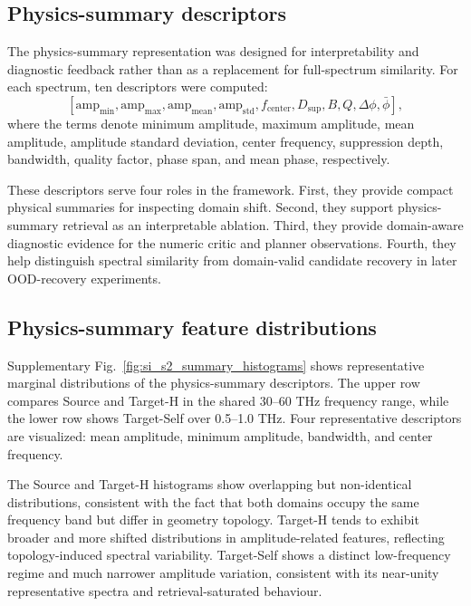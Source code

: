 \documentclass[final,1p,times]{elsarticle}
\begin{document}
\subsection{Physics-summary descriptors}

The physics-summary representation was designed for interpretability and diagnostic feedback rather than as a replacement for full-spectrum similarity. For each spectrum, ten descriptors were computed:
\begin{equation}
\left[
\mathrm{amp}_{\min},
\mathrm{amp}_{\max},
\mathrm{amp}_{\mathrm{mean}},
\mathrm{amp}_{\mathrm{std}},
f_{\mathrm{center}},
D_{\mathrm{sup}},
B,
Q,
\Delta\phi,
\bar{\phi}
\right],
\end{equation}
where the terms denote minimum amplitude, maximum amplitude, mean amplitude, amplitude standard deviation, center frequency, suppression depth, bandwidth, quality factor, phase span, and mean phase, respectively.

These descriptors serve four roles in the framework. First, they provide compact physical summaries for inspecting domain shift. Second, they support physics-summary retrieval as an interpretable ablation. Third, they provide domain-aware diagnostic evidence for the numeric critic and planner observations. Fourth, they help distinguish spectral similarity from domain-valid candidate recovery in later OOD-recovery experiments.

\subsection{Physics-summary feature distributions}

Supplementary Fig.~\ref{fig:si_s2_summary_histograms} shows representative marginal distributions of the physics-summary descriptors. The upper row compares Source and Target-H in the shared 30--60 THz frequency range, while the lower row shows Target-Self over 0.5--1.0 THz. Four representative descriptors are visualized: mean amplitude, minimum amplitude, bandwidth, and center frequency.

The Source and Target-H histograms show overlapping but non-identical distributions, consistent with the fact that both domains occupy the same frequency band but differ in geometry topology. Target-H tends to exhibit broader and more shifted distributions in amplitude-related features, reflecting topology-induced spectral variability. Target-Self shows a distinct low-frequency regime and much narrower amplitude variation, consistent with its near-unity representative spectra and retrieval-saturated behaviour.
\end{document}
